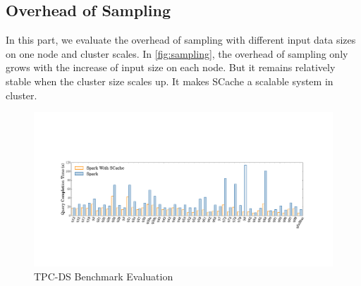 \subsection{Overhead of Sampling}
In this part, we evaluate the overhead of sampling with different input data sizes on one node and cluster scales. In \ref{fig:sampling}, the overhead of sampling only grows with the increase of input size on each node. But it remains relatively stable when the cluster size scales up. It makes SCache a scalable system in cluster.
\begin{figure}
	\includegraphics[width=\textwidth]{fig/tpcds}
	\caption{TPC-DS Benchmark Evaluation}
	\label{fig:tpcds}
\end{figure}


